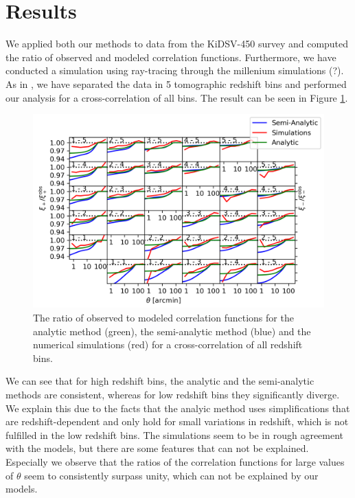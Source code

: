 \section{Results}
\label{sec:results}
We applied both our methods to data from the KiDSV-450 survey and computed the ratio of observed and modeled correlation functions. Furthermore, we have conducted a simulation using ray-tracing through the millenium simulations (?). As in \citet{2018arXiv181206076H}, we have separated the data in 5 tomographic redshift bins and performed our analysis for a cross-correlation of all bins. The result can be seen in Figure \ref{fig:all_xis}.
	\begin{figure}
	\centering
	\includegraphics[width=1\textwidth]{images/xis_111.png}
	\caption{The ratio of observed to modeled correlation functions for the analytic method (green), the semi-analytic method (blue) and the numerical simulations (red) for a cross-correlation of all redshift bins.}
	\label{fig:all_xis}
	\end{figure}
We can see that for high redshift bins, the analytic and the semi-analytic methods are consistent, whereas for low redshift bins they significantly diverge. We explain this due to the facts that the analyic method uses simplifications that are redshift-dependent and only hold for small variations in redshift, which is not fulfilled in the low redshift bins. The simulations seem to be in rough agreement with the models, but there are some features that can not be explained. Especially we observe that the ratios of the correlation functions for large values of $\theta$ seem to consistently surpass unity, which can not be explained by our models.

